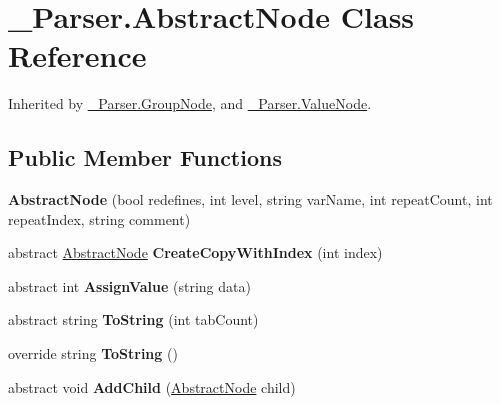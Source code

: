 \hypertarget{class__1920_parser_1_1_abstract_node}{}\section{\+\_\+Parser.\+Abstract\+Node Class Reference}
\label{class__1920_parser_1_1_abstract_node}


 




Inherited by \hyperlink{class__1920_parser_1_1_group_node}{\+\_\+Parser.\+Group\+Node}, and \hyperlink{class__1920_parser_1_1_value_node}{\+\_\+Parser.\+Value\+Node}.

\subsection*{Public Member Functions}
\begin{DoxyCompactItemize}
\item 
{\bfseries Abstract\+Node} (bool redefines, int level, string var\+Name, int repeat\+Count, int repeat\+Index, string comment)\hypertarget{class__1920_parser_1_1_abstract_node_aebc3c9efb2855add3285f717edd5ca86}{}\label{class__1920_parser_1_1_abstract_node_aebc3c9efb2855add3285f717edd5ca86}

\item 
abstract \hyperlink{class__1920_parser_1_1_abstract_node}{Abstract\+Node} {\bfseries Create\+Copy\+With\+Index} (int index)\hypertarget{class__1920_parser_1_1_abstract_node_a636ae975a7e037fb31c4d4341e222c1b}{}\label{class__1920_parser_1_1_abstract_node_a636ae975a7e037fb31c4d4341e222c1b}

\item 
abstract int {\bfseries Assign\+Value} (string data)\hypertarget{class__1920_parser_1_1_abstract_node_a457498d3ec29d4c2af707aad2cf3bfc9}{}\label{class__1920_parser_1_1_abstract_node_a457498d3ec29d4c2af707aad2cf3bfc9}

\item 
abstract string {\bfseries To\+String} (int tab\+Count)\hypertarget{class__1920_parser_1_1_abstract_node_ae41877e0bad1b9ed1e4b5ae8c01bca60}{}\label{class__1920_parser_1_1_abstract_node_ae41877e0bad1b9ed1e4b5ae8c01bca60}

\item 
override string {\bfseries To\+String} ()\hypertarget{class__1920_parser_1_1_abstract_node_a2fef1588cfaa3d7979c8fd3af77d08d3}{}\label{class__1920_parser_1_1_abstract_node_a2fef1588cfaa3d7979c8fd3af77d08d3}

\item 
abstract void {\bfseries Add\+Child} (\hyperlink{class__1920_parser_1_1_abstract_node}{Abstract\+Node} child)\hypertarget{class__1920_parser_1_1_abstract_node_af6241531937bb83d55aea81268b97f0b}{}\label{class__1920_parser_1_1_abstract_node_af6241531937bb83d55aea81268b97f0b}

\end{DoxyCompactItemize}

